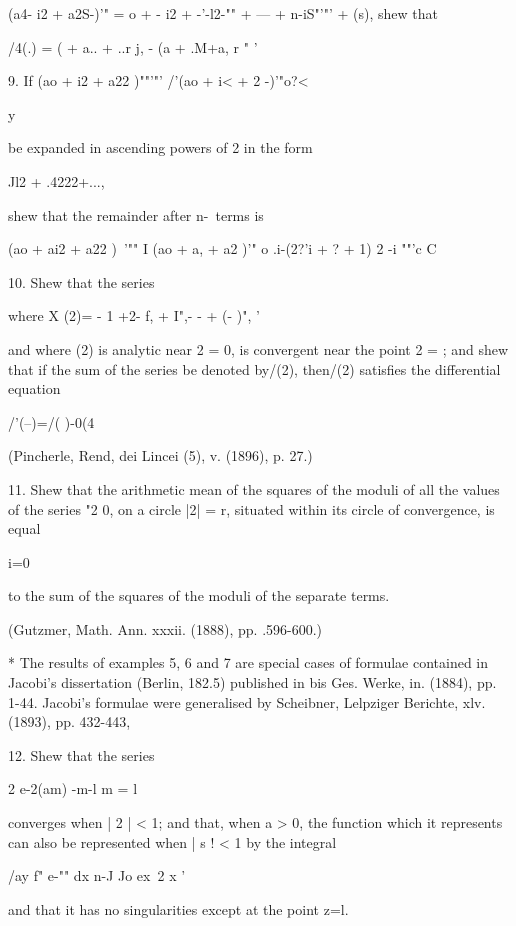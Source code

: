 {{{{(a4- i2 + a2S-)'" = o + - i2 + -'-l2-"" + --- + n-iS"'"' + (s), shew
that

/4(.) = ( + a.. + ..r j, - (a + .M+a, r " ' 

9. If (ao + i2 + a22 )""'"' /'(ao + i< + 2 -)'"o?<

y


be expanded in ascending powers of 2 in the form

Jl2 + .4222+...,

shew that the remainder after n-\ terms is

(ao + ai2 + a22 )~'"" I (ao + a, + a2 )'" o .i-(2?'i + ? + 1) 2 -i
""'c C


10. Shew that the series

where X (2)= - 1 +2- f, + I",- - + (- )", '

and where (2) is analytic near 2 = 0, is convergent near the point 2 =
; and shew that if the sum of the series be denoted by/(2), then/(2)
satisfies the differential equation

/'(--)=/( )-0(4

(Pincherle, Rend, dei Lincei (5), v. (1896), p. 27.)

11. Shew that the arithmetic mean of the squares of the moduli of all
the values of the series "2 0, on a circle |2| = r, situated within
its circle of convergence, is equal

 i=0

to the sum of the squares of the moduli of the separate terms.

(Gutzmer, Math. Ann. xxxii. (1888), pp. .596-600.)

* The results of examples 5, 6 and 7 are special cases of formulae
contained in Jacobi's dissertation (Berlin, 182.5) published in bis
Ges. Werke, in. (1884), pp. 1-44. Jacobi's formulae were generalised
by Scheibner, Lelpziger Berichte, xlv. (1893), pp. 432-443,

%
%

12. Shew that the series

2 e-2(am) -m-l m = l

converges when | 2 | < 1; and that, when a > 0, the function which it
represents can also be represented when | s ! < 1 by the integral

/ay f" e-"" dx n-J Jo ex\ 2 x '

and that it has no singularities except at the point z=l.

}}}}
